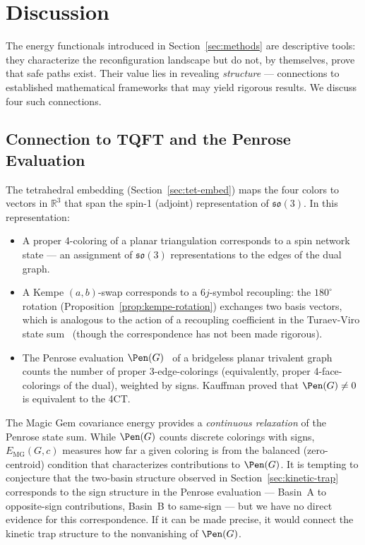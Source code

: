 
\section{Discussion}\label{sec:discussion}

The energy functionals introduced in Section~\ref{sec:methods} are
descriptive tools: they characterize the reconfiguration landscape but
do not, by themselves, prove that safe paths exist. Their value lies
in revealing \emph{structure} — connections to established mathematical
frameworks that may yield rigorous results. We discuss four such
connections.

\subsection{Connection to TQFT and the Penrose Evaluation}
\label{sec:tqft}

The tetrahedral embedding (Section~\ref{sec:tet-embed}) maps the four
colors to vectors in $\mathbb{R}^3$ that span the spin-1
(adjoint) representation of $\mathfrak{so}(3)$. In this representation:

\begin{itemize}
  \item A proper 4-coloring of a planar triangulation corresponds to a
    spin network state — an assignment of $\mathfrak{so}(3)$
    representations to the edges of the dual graph.
  \item A Kempe $(a,b)$-swap corresponds to a $6j$-symbol recoupling:
    the $180^\circ$ rotation (Proposition~\ref{prop:kempe-rotation})
    exchanges two basis vectors, which is analogous to the action of a
    recoupling coefficient in the Turaev-Viro state
    sum~\cite{turaev1992} (though the correspondence has not been made
    rigorous).
  \item The Penrose evaluation $\Pen(G)$~\cite{kauffman1990} of a
    bridgeless planar trivalent graph counts the number of proper
    3-edge-colorings (equivalently, proper 4-face-colorings of the
    dual), weighted by signs. Kauffman proved that $\Pen(G) \neq 0$
    is equivalent to the 4CT.
\end{itemize}

The Magic Gem covariance energy provides a \emph{continuous relaxation}
of the Penrose state sum. While $\Pen(G)$ counts discrete colorings
with signs, $E_{\mathrm{MG}}(G, c)$ measures how far a given coloring
is from the balanced (zero-centroid) condition that characterizes
contributions to $\Pen(G)$. It is tempting to conjecture that the
two-basin structure observed in Section~\ref{sec:kinetic-trap}
corresponds to the sign structure in the Penrose evaluation —
Basin~A to opposite-sign contributions, Basin~B to same-sign — but we
have no direct evidence for this correspondence. If it can be made
precise, it would connect the kinetic trap structure to the
nonvanishing of $\Pen(G)$.

